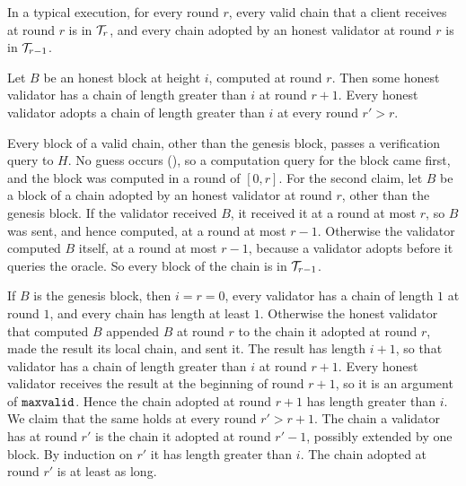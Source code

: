 \begin{lemma}[Membership]\label{lem.membership}
    In a typical execution, for every round $r$, every valid chain that a
    client receives at round $r$ is in $\mathcal{T}_r$, and every chain adopted by an
    honest validator at round $r$ is in $\mathcal{T}_{r-1}$.
\end{lemma}

\begin{lemma}\label{lem.fork}
    Let $B$ be an honest block at height $i$, computed at round $r$. Then some
    honest validator has a chain of length greater than $i$ at round $r+1$.
    Every honest validator adopts a chain of length greater than $i$ at every
    round $r'>r$.
\end{lemma}

\begin{proofof}{}
    Every block of a valid chain, other than the genesis block, passes a
    verification query to $H$. No guess occurs (), so a
    computation query for the block came first, and the block was computed in a
    round of $[0,r]$. For the second claim, let $B$ be a
    block of a chain adopted by an honest validator at round $r$, other than the
    genesis block. If the validator received $B$, it received it at a round at
    most $r$, so $B$ was sent, and hence computed, at a round at most $r-1$.
    Otherwise the validator computed $B$ itself, at a round at most $r-1$,
    because a validator adopts before it queries the oracle. So every block of
    the chain is in $\mathcal{T}_{r-1}$.
\end{proofof}

\begin{proofof}{}
    If $B$ is the genesis block, then $i=r=0$, every validator has a chain of
    length $1$ at round $1$, and every chain has length at least $1$. Otherwise
    the honest validator that computed $B$ appended $B$ at round $r$ to the
    chain it adopted at round $r$, made the result its local chain, and sent it.
    The result has length $i+1$, so that validator has a chain of length
    greater than $i$ at round $r+1$. Every honest validator receives the
    result at the beginning of round $r+1$, so it is an argument of
    $\mathtt{maxvalid}$. Hence the chain adopted at round $r+1$ has length greater
    than $i$. We claim that the same holds at every round $r'>r+1$. The chain a
    validator has at round $r'$ is the chain it adopted at round $r'-1$,
    possibly extended by one block. By induction on $r'$ it has length greater
    than $i$. The chain adopted at round $r'$ is at least as long.
\end{proofof}

